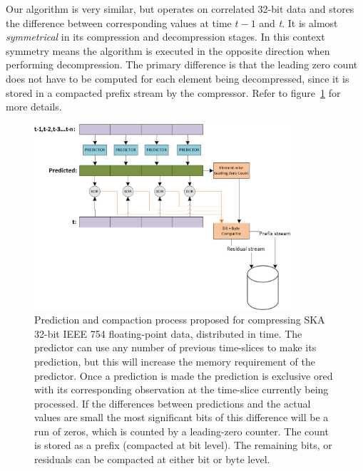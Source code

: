 Our algorithm is very similar, but operates on correlated 32-bit data and stores the difference between corresponding values at time $t-1$ and \textit{t}. It is almost \textit{symmetrical} in its 
compression and decompression stages. In this context symmetry means the algorithm is executed in the opposite direction when performing decompression. The primary difference is that the leading 
zero count does not have to be computed for each element being decompressed, since it is stored in a compacted prefix stream by the compressor. Refer to figure~\ref{PACKING_ALGORITHM} for more details.
\begin{figure}[h!]
\begin{mdframed}
 \centering
 \includegraphics[width=0.85\textwidth]{Thesis_Alg.png}
 \caption[Prediction and compaction process]{Prediction and compaction process proposed for compressing SKA 32-bit IEEE 754 floating-point data, distributed in time. The predictor can use any number of previous time-slices to make its prediction,
 but this will increase the memory requirement of the predictor. Once a prediction is made the prediction is exclusive ored with its corresponding observation at the time-slice currently being
 processed. If the differences between predictions and the actual values are small the most significant bits of this difference will be a run of zeros, which is counted by a leading-zero counter. The count is 
 stored as a prefix (compacted at bit level). The remaining bits, or residuals can be compacted at either bit or byte level.}
 \label{PACKING_ALGORITHM}
\end{mdframed}
\end{figure}

